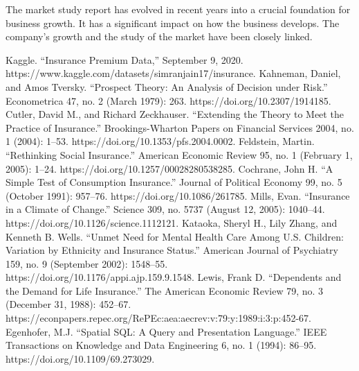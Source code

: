 \documentclass[journal]{IEEEtran}
\begin{document}
\par The market study report has evolved in recent years into a crucial foundation for business growth. It has a significant impact on how the business develops. The company's growth and the study of the market have been closely linked.




\begin{thebibliography}{1.7} 
	 \color{cyan}Kaggle. “Insurance Premium Data,” September 9, 2020. https://www.kaggle.com/datasets/simranjain17/insurance.\color{black}
         \color{cyan} Kahneman, Daniel, and Amos Tversky. “Prospect Theory: An Analysis of Decision under Risk.” Econometrica 47, no. 2 (March 1979): 263. https://doi.org/10.2307/1914185.  \color{black}
         \color{cyan} Cutler, David M., and Richard Zeckhauser. “Extending the Theory to Meet the Practice of Insurance.” Brookings-Wharton Papers on Financial Services 2004, no. 1 (2004): 1–53. https://doi.org/10.1353/pfs.2004.0002.  \color{black}
         \color{cyan} Feldstein, Martin. “Rethinking Social Insurance.” American Economic Review 95, no. 1 (February 1, 2005): 1–24. https://doi.org/10.1257/00028280538285.  \color{black}
         \color{cyan}Cochrane, John H. “A Simple Test of Consumption Insurance.” Journal of Political Economy 99, no. 5 (October 1991): 957–76. https://doi.org/10.1086/261785.  \color{black}
         \color{cyan} Mills, Evan. “Insurance in a Climate of Change.” Science 309, no. 5737 (August 12, 2005): 1040–44. https://doi.org/10.1126/science.1112121. \color{black}
         \color{cyan} Kataoka, Sheryl H., Lily Zhang, and Kenneth B. Wells. “Unmet Need for Mental Health Care Among U.S. Children: Variation by Ethnicity and Insurance Status.” American Journal of Psychiatry 159, no. 9 (September 2002): 1548–55. https://doi.org/10.1176/appi.ajp.159.9.1548. \color{black}
         \color{cyan} Lewis, Frank D. “Dependents and the Demand for Life Insurance.” The American Economic Review 79, no. 3 (December 31, 1988): 452–67. https://econpapers.repec.org/RePEc:aea:aecrev:v:79:y:1989:i:3:p:452-67. \color{black}
         \color{cyan} Egenhofer, M.J. “Spatial SQL: A Query and Presentation Language.” IEEE Transactions on Knowledge and Data Engineering 6, no. 1 (1994): 86–95. https://doi.org/10.1109/69.273029. \color{black}

\end{thebibliography}
\end{document}
